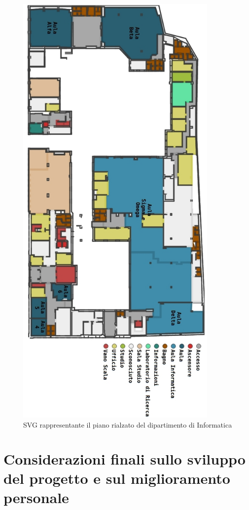 \documentclass[12pt]{report}
\begin{document}
\begin{figure}[H]
    \centering
    \includegraphics[width=280pt]{Comelico-SVG.jpg}
    \caption{SVG rappresentante il piano rialzato del dipartimento di Informatica}
    \label{fig:Comelico-SVG}
\end{figure}

\newpage
\section{Considerazioni finali sullo sviluppo del progetto e sul miglioramento personale}
\end{document}
